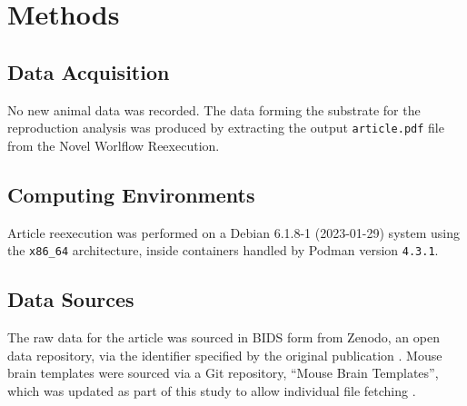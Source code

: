 \section{Methods}


\subsection{Data Acquisition}

No new animal data was recorded.
The data forming the substrate for the reproduction analysis was produced by extracting the output \texttt{article.pdf} file from the Novel Worlflow Reexecution.

\subsection{Computing Environments}
Article reexecution was performed on a Debian 6.1.8-1 (2023-01-29) system using the \texttt{x86\_64} architecture, inside containers handled by Podman version \texttt{4.3.1}.

\subsection{Data Sources}
The raw data for the article was sourced in BIDS form from Zenodo, an open data repository, via the identifier specified by the original publication \cite{opfvta_bidsdata}.
Mouse brain templates were sourced via a Git repository, “Mouse Brain Templates”, which was updated as part of this study to allow individual file fetching \cite{mbt10}.




